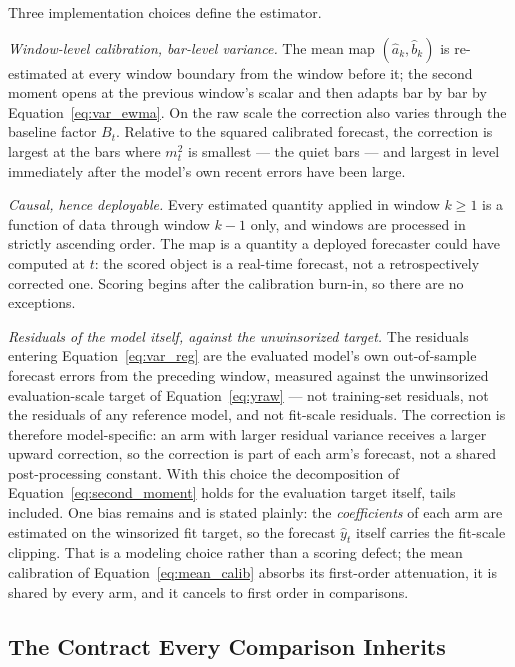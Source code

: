 Three implementation choices define the estimator.

\emph{Window-level calibration, bar-level variance.} The mean map
$(\hat{a}_k, \hat{b}_k)$ is re-estimated at every window boundary from
the window before it; the second moment opens at the previous window's
scalar and then adapts bar by bar by Equation~\eqref{eq:var_ewma}. On
the raw scale the correction also varies through the baseline factor
$B_t$. Relative to the squared calibrated forecast, the correction is
largest at the bars where $m_t^2$ is smallest --- the quiet bars ---
and largest in level immediately after the model's own recent errors
have been large.

\emph{Causal, hence deployable.} Every estimated quantity applied in
window $k \ge 1$ is a function of data through window $k-1$ only, and
windows are processed in strictly ascending order. The map is a quantity a
deployed forecaster could have computed at $t$: the scored object is a
real-time forecast, not a retrospectively corrected one. Scoring begins
after the calibration burn-in, so there are no exceptions.

\emph{Residuals of the model itself, against the unwinsorized target.} The
residuals entering Equation~\eqref{eq:var_reg} are the evaluated model's
own out-of-sample forecast errors from the preceding window, measured
against the unwinsorized evaluation-scale target of
Equation~\eqref{eq:yraw} --- not training-set residuals, not the residuals
of any reference model, and not fit-scale residuals. The correction is
therefore model-specific: an arm with larger residual variance receives a
larger upward correction, so the correction is part of each arm's
forecast, not a shared post-processing constant. With this choice the
decomposition of Equation~\eqref{eq:second_moment} holds for the
evaluation target itself, tails included. One bias remains and is stated
plainly: the \emph{coefficients} of each arm are estimated on the
winsorized fit target, so the forecast $\hat{y}_t$ itself carries the
fit-scale clipping. That is a modeling choice rather than a scoring
defect; the mean calibration of Equation~\eqref{eq:mean_calib} absorbs its
first-order attenuation, it is shared by every arm, and it cancels to
first order in comparisons.

\subsection{The Contract Every Comparison Inherits}
\label{sec:smearing_contract}

